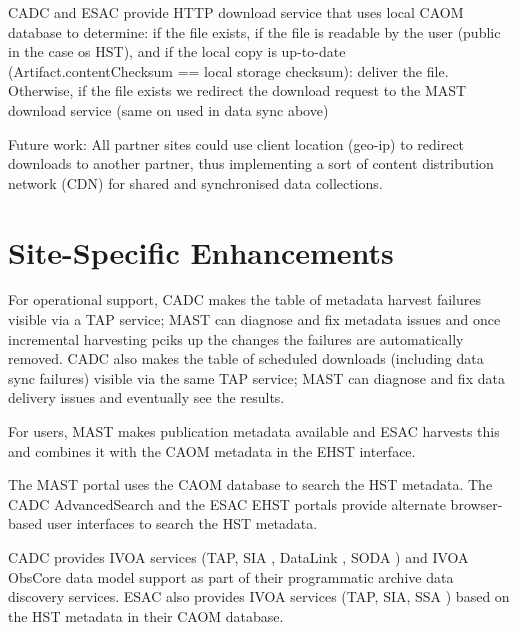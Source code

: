 \documentclass[11pt,twoside]{article}
\begin{document}
CADC and ESAC provide HTTP download service that uses local CAOM database to determine: if the file exists, if the file is readable by the user (public in the case os HST), and if the local copy is up-to-date (Artifact.contentChecksum == local storage checksum): deliver the file. Otherwise, if the file exists we redirect the download request to the MAST download service (same on used in data sync above)

Future work: All partner sites could use client location (geo-ip) to redirect downloads to another partner, thus implementing a sort of content distribution network (CDN) for shared and synchronised data collections.

\section{Site-Specific Enhancements}

For operational support, CADC makes the table of metadata harvest failures visible via a TAP \citep{std:TAP} service; MAST can diagnose and fix metadata issues and once incremental harvesting pciks up the changes the failures are automatically removed. CADC also makes the table of scheduled downloads (including data sync failures) visible via the same TAP service; MAST can diagnose and fix data delivery issues and eventually see the results.

For users, MAST makes publication metadata available and ESAC harvests this and combines it with the CAOM metadata in the EHST interface.

The MAST portal uses the CAOM database to search the HST metadata. The CADC AdvancedSearch and the ESAC EHST portals provide alternate browser-based user interfaces to search the HST metadata.

CADC provides IVOA services (TAP, SIA \citep{std:SIA}, DataLink \citep{std:DataLink}, SODA \citep{std:SODA}) and IVOA ObsCore data model support as part of their programmatic archive data discovery services. ESAC also provides IVOA services (TAP, SIA, SSA \citep{std:SSA}) based on the HST metadata in their CAOM database.


\end{document}
